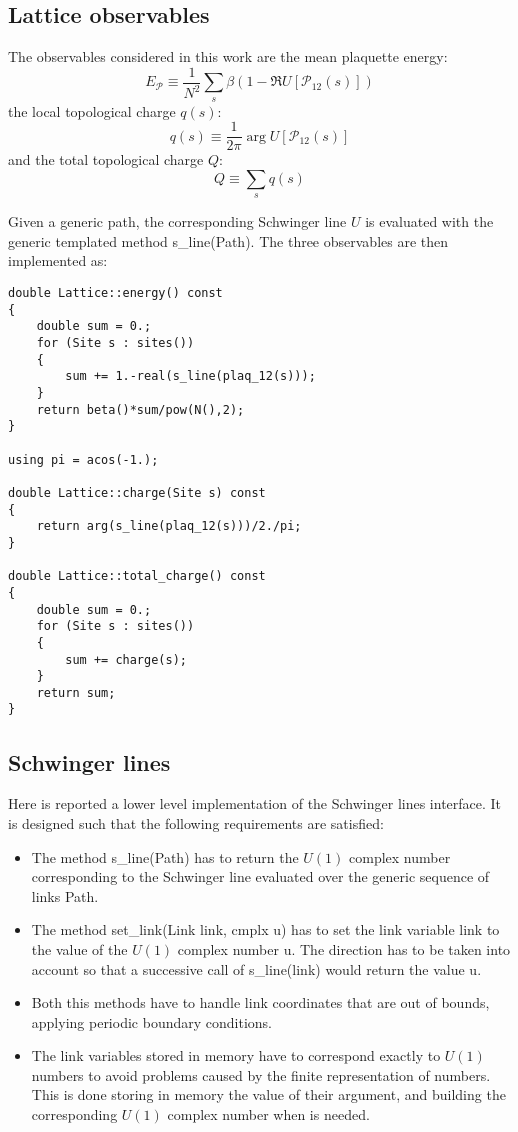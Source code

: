 \subsection*{Lattice observables}

The observables considered in this work are the mean plaquette energy:
\[
    E_{\mathcal P} \equiv \frac{1}{N^2}\sum_s \beta\left(1-\Re U[\mathcal P_{12}(s)]\right)
\]
the local topological charge $q(s)$:
\[
    q(s) \equiv \frac{1}{2\pi}\arg U[\mathcal P_{12}(s)]
\]
and the total topological charge $Q$:
\[
    Q \equiv \sum_s q(s)
\]

Given a generic path, the corresponding Schwinger line $U$ is evaluated with the generic templated method {\ttfamily s\_line(Path)}.
The three observables are then implemented as:
\begin{lstlisting}[caption={Lattice observables}]
double Lattice::energy() const
{
    double sum = 0.;
    for (Site s : sites())
    {
        sum += 1.-real(s_line(plaq_12(s)));
    }
    return beta()*sum/pow(N(),2);
}

using pi = acos(-1.);

double Lattice::charge(Site s) const
{
    return arg(s_line(plaq_12(s)))/2./pi;
}

double Lattice::total_charge() const
{
    double sum = 0.;
    for (Site s : sites())
    {
        sum += charge(s);
    }
    return sum;
}
\end{lstlisting}

\subsection*{Schwinger lines}

Here is reported a lower level implementation of the Schwinger lines interface.
It is designed such that the following requirements are satisfied:
\begin{itemize}
    \item The method {\ttfamily s\_line(Path)} has to return the $U(1)$ complex number corresponding to the Schwinger line evaluated over the generic sequence of links {\ttfamily Path}.
    \item The method {\ttfamily set\_link(Link link, cmplx u)} has to set the link variable {\ttfamily link} to the value of the $U(1)$ complex number {\ttfamily u}.
        The direction has to be taken into account so that a successive call of {\ttfamily s\_line(link)} would return the value {\ttfamily u}.
    \item Both this methods have to handle link coordinates that are out of bounds, applying periodic boundary conditions.
    \item The link variables stored in memory have to correspond exactly to $U(1)$ numbers to avoid problems caused by the finite representation of numbers.
        This is done storing in memory the value of their argument, and building the corresponding $U(1)$ complex number when is needed.
\end{itemize}

